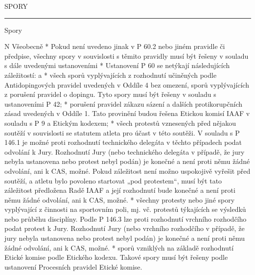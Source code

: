 \chap SPORY

\rule{59}
\secc Spory

\begitems \style N
Všeobecně
* Pokud není uvedeno jinak v P 60.2 nebo jiném pravidle či předpise, všechny spory v souvislosti s těmito pravidly musí být řešeny v souladu s dále uvedenými ustanoveními
* Ustanovení P 60 se netýkají následujících záležitostí:
  \begitems \style a
  * všech sporů vyplývajících z rozhodnutí učiněných podle Antidopingových pravidel uvedených v Oddíle 4 bez omezení, sporů vyplývajících z porušení pravidel o dopingu. Tyto spory musí být řešeny v souladu s ustanoveními P 42;
  * porušení pravidel zákazu sázení a dalších protikorupčních zásad uvedených v Oddíle 1. Tato provinění budou řešena Etickou komisí IAAF v souladu s P 9 a Etickým kodexem;
  * všech protestů vznesených před nějakou soutěží v souvislosti se statutem atleta pro účast v této soutěži. V souladu s P 146.1 je možné proti rozhodnutí technického delegáta v těchto případech podat odvolání k Jury. Rozhodnutí Jury (nebo technického delegáta v případě, že jury nebyla ustanovena nebo protest nebyl podán) je konečné a není proti němu žádné odvolání, ani k CAS, možné. Pokud záležitost není možno uspokojivě vyřešit před soutěží, a atletu bylo povoleno startovat „pod protestem“, musí být tato záležitost předložena Radě IAAF a její rozhodnutí bude konečné a není proti němu žádné odvolání, ani k CAS, možné.
  * všechny protesty nebo jiné spory vyplývající z činnosti na sportovním poli, mj. vč. protestů týkajících se výsledků nebo průběhu disciplíny. Podle P 146.3 lze proti rozhodnutí vrchního rozhodčího podat protest k Jury. Rozhodnutí Jury (nebo vrchního rozhodčího v případě, že jury nebyla ustanovena nebo protest nebyl podán) je konečné a není proti němu žádné odvolání, ani k CAS, možné.
  * sporů vzniklých na základě rozhodnutí Etické komise podle Etického kodexu. Takové spory musí být řešeny podle ustanovení Procesních pravidel Etické komise.
  \enditems

